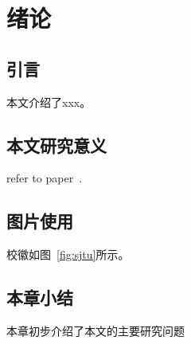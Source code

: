 \newpage
{}
\section{绪论}\label{sec:introduction}
\subsection{引言} %

本文介绍了xxx。

\subsection{本文研究意义}\label{subsec:introduction_meaning}
refer to paper~\cite{paper}.

\subsection{图片使用}\label{subsec:how_to_insert_figure}

校徽如图~\ref{fig:sjtu}所示。

\subsection{本章小结}
本章初步介绍了本文的主要研究问题